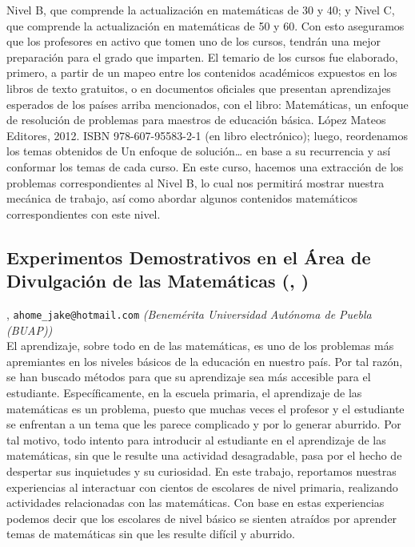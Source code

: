 Nivel B, que comprende la actualización en matemáticas de 30 y 40; y Nivel C, que comprende la actualización en matemáticas de 50 y 60. Con esto aseguramos que los profesores en activo que tomen uno de los cursos, tendrán una mejor preparación para el grado que imparten. El temario de los cursos fue elaborado, primero, a partir de un mapeo entre los contenidos académicos expuestos en los libros de texto gratuitos, o en documentos oficiales que presentan aprendizajes esperados de los países arriba mencionados, con el libro: Matemáticas, un enfoque de resolución de problemas para maestros de educación básica. López Mateos Editores, 2012. ISBN 978-607-95583-2-1 (en libro electrónico); luego, reordenamos los temas obtenidos de Un enfoque de solución… en base a su recurrencia y así conformar los temas de cada curso. En este curso, hacemos una extracción de los problemas correspondientes al Nivel B, lo cual nos permitirá mostrar nuestra mecánica de trabajo, así como abordar algunos contenidos matemáticos correspondientes con este nivel.
\subsection{\sffamily Experimentos Demostrativos en el Área de Divulgación de las Matemáticas {\footnotesize (, )}} \label{reg-1695} 
, {\tt ahome_jake@hotmail.com}  {\slshape (Benemérita Universidad Autónoma de Puebla (BUAP))}\\
          \noindent El aprendizaje, sobre todo en de las matemáticas, es uno de los problemas más apremiantes en los niveles básicos de la educación en nuestro país. Por tal razón, se han buscado métodos para que su aprendizaje sea más accesible para el estudiante. Específicamente, en la escuela primaria, el aprendizaje de las matemáticas es un problema, puesto que  muchas veces el profesor y el estudiante se enfrentan a un tema que les parece complicado y por lo generar aburrido. Por tal motivo, todo intento para introducir al estudiante en el aprendizaje de las matemáticas, sin que le resulte una actividad desagradable, pasa por el hecho de despertar sus inquietudes y su curiosidad. En este trabajo, reportamos nuestras experiencias al interactuar con cientos de escolares de nivel primaria, realizando actividades relacionadas con las matemáticas. Con base en estas experiencias podemos decir  que los escolares de nivel básico se sienten atraídos por aprender temas de matemáticas sin que les resulte difícil y aburrido.
